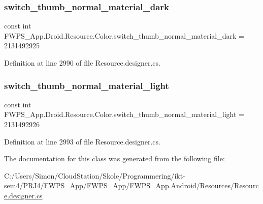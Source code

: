 \subsubsection{\texorpdfstring{switch\+\_\+thumb\+\_\+normal\+\_\+material\+\_\+dark}{switch\_thumb\_normal\_material\_dark}}
{\footnotesize\ttfamily const int F\+W\+P\+S\+\_\+\+App.\+Droid.\+Resource.\+Color.\+switch\+\_\+thumb\+\_\+normal\+\_\+material\+\_\+dark = 2131492925}



Definition at line 2990 of file Resource.\+designer.\+cs.

\mbox{\label{class_f_w_p_s___app_1_1_droid_1_1_resource_1_1_color_ab19155885e1d5c2d01cc913cfd9a8b2b}} 
\subsubsection{\texorpdfstring{switch\+\_\+thumb\+\_\+normal\+\_\+material\+\_\+light}{switch\_thumb\_normal\_material\_light}}
{\footnotesize\ttfamily const int F\+W\+P\+S\+\_\+\+App.\+Droid.\+Resource.\+Color.\+switch\+\_\+thumb\+\_\+normal\+\_\+material\+\_\+light = 2131492926}



Definition at line 2993 of file Resource.\+designer.\+cs.



The documentation for this class was generated from the following file\+:\begin{DoxyCompactItemize}
\item 
C\+:/\+Users/\+Simon/\+Cloud\+Station/\+Skole/\+Programmering/ikt-\/sem4/\+P\+R\+J4/\+F\+W\+P\+S\+\_\+\+App/\+F\+W\+P\+S\+\_\+\+App/\+F\+W\+P\+S\+\_\+\+App.\+Android/\+Resources/\mbox{\hyperlink{_resource_8designer_8cs}{Resource.\+designer.\+cs}}\end{DoxyCompactItemize}
